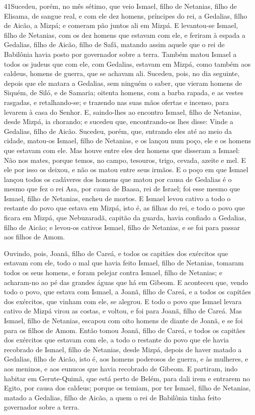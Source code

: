 \lettrine{41} Sucedeu, porém, no mês sétimo, que veio Ismael,
filho de Netanias, filho de Elisama, de sangue real, e com ele dez
homens, príncipes do rei, a Gedalias, filho de Aicão, a Mizpá; e
comeram pão juntos ali em Mizpá. E levantou-se Ismael, filho de
Netanias, com os dez homens que estavam com ele, e feriram à espada
a Gedalias, filho de Aicão, filho de Safã, matando assim aquele que
o rei de Babilônia havia posto por governador sobre a terra.
Também matou Ismael a todos os judeus que com ele, com Gedalias,
estavam em Mizpá, como também aos caldeus, homens de guerra, que se
achavam ali. Sucedeu, pois, no dia seguinte, depois que ele
matara a Gedalias, sem ninguém o saber, que vieram homens de
Siquém, de Siló, e de Samaria; oitenta homens, com a barba rapada, e
as vestes rasgadas, e retalhando-se; e trazendo nas suas mãos
ofertas e incenso, para levarem à casa do Senhor. E, saindo-lhes
ao encontro Ismael, filho de Netanias, desde Mizpá, ia chorando; e
sucedeu que, encontrando-os lhes disse: Vinde a Gedalias, filho de
Aicão. Sucedeu, porém, que, entrando eles até ao meio da cidade,
matou-os Ismael, filho de Netanias, e os lançou num poço, ele e os
homens que estavam com ele. Mas houve entre eles dez homens que
disseram a Ismael: Não nos mates, porque temos, no campo, tesouros,
trigo, cevada, azeite e mel. E ele por isso os deixou, e não os
matou entre seus irmãos. E o poço em que Ismael lançou todos os
cadáveres dos homens que matou por causa de Gedalias é o mesmo que
fez o rei Asa, por causa de Baasa, rei de Israel; foi esse mesmo que
Ismael, filho de Netanias, encheu de mortos. E Ismael levou
cativo a todo o restante do povo que estava em Mizpá, isto é, as
filhas do rei, e todo o povo que ficara em Mizpá, que Nebuzaradã,
capitão da guarda, havia confiado a Gedalias, filho de Aicão; e
levou-os cativos Ismael, filho de Netanias, e se foi para passar aos
filhos de Amom.

Ouvindo, pois, Joanã, filho de Careá, e todos os capitães dos
exércitos que estavam com ele, todo o mal que havia feito Ismael,
filho de Netanias, tomaram todos os seus homens, e foram
pelejar contra Ismael, filho de Netanias; e acharam-no ao pé das
grandes águas que há em Gibeom. E aconteceu que, vendo todo o
povo, que estava com Ismael, a Joanã, filho de Careá, e a todos os
capitães dos exércitos, que vinham com ele, se alegrou. E
todo o povo que Ismael levara cativo de Mizpá virou as costas, e
voltou, e foi para Joanã, filho de Careá. Mas Ismael, filho
de Netanias, escapou com oito homens de diante de Joanã, e se foi
para os filhos de Amom. Então tomou Joanã, filho de Careá, e
todos os capitães dos exércitos que estavam com ele, a todo o
restante do povo que ele havia recobrado de Ismael, filho de
Netanias, desde Mizpá, depois de haver matado a Gedalias, filho de
Aicão, isto é, aos homens poderosos de guerra, e às mulheres, e aos
meninos, e aos eunucos que havia recobrado de Gibeom. E
partiram, indo habitar em Gerute-Quimã, que está perto de Belém,
para dali irem e entrarem no Egito, por causa dos caldeus;
porque os temiam, por ter Ismael, filho de Netanias, matado a
Gedalias, filho de Aicão, a quem o rei de Babilônia tinha feito
governador sobre a terra.

